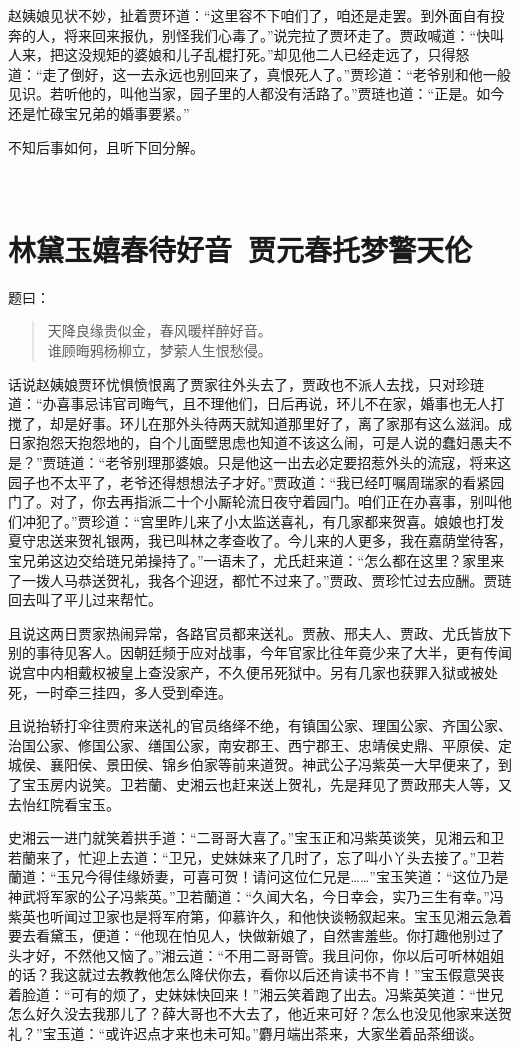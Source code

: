 \documentclass[12pt,oneside]{book}
\newenvironment{shici}{%
\begin{verse}%
\centering\large\hspace{12pt}}%
{\end{verse}}
\begin{document}
赵姨娘见状不妙，扯着贾环道：“这里容不下咱们了，咱还是走罢。到外面自有投奔的人，将来回来报仇，别怪我们心毒了。”说完拉了贾环走了。贾政喊道：“快叫人来，把这没规矩的婆娘和儿子乱棍打死。”却见他二人已经走远了，只得怒道：“走了倒好，这一去永远也别回来了，真恨死人了。”贾珍道：“老爷别和他一般见识。若听他的，叫他当家，园子里的人都没有活路了。”贾琏也道：“正是。如今还是忙碌宝兄弟的婚事要紧。”

不知后事如何，且听下回分解。

 
 
\chapter{林黛玉嬉春待好音~贾元春托梦警天伦}
题曰：

\begin{shici}
天降良缘贵似金，春风暖样醉好音。\\
谁顾晦鸦杨柳立，梦萦人生恨愁侵。
\end{shici}

话说赵姨娘贾环忧惧愤恨离了贾家往外头去了，贾政也不派人去找，只对珍琏道：“办喜事忌讳官司晦气，且不理他们，日后再说，环儿不在家，婚事也无人打搅了，却是好事。环儿在那外头待两天就知道那里好了，离了家那有这么滋润。成日家抱怨天抱怨地的，自个儿面壁思虑也知道不该这么闹，可是人说的蠢妇愚夫不是？”贾琏道：“老爷别理那婆娘。只是他这一出去必定要招惹外头的流寇，将来这园子也不太平了，老爷还得想想法子才好。”贾政道：“我已经叮嘱周瑞家的看紧园门了。对了，你去再指派二十个小厮轮流日夜守着园门。咱们正在办喜事，别叫他们冲犯了。”贾珍道：“宫里昨儿来了小太监送喜礼，有几家都来贺喜。娘娘也打发夏守忠送来贺礼银两，我已叫林之孝查收了。今儿来的人更多，我在嘉荫堂待客，宝兄弟这边交给琏兄弟操持了。”一语未了，尤氏赶来道：“怎么都在这里？家里来了一拨人马恭送贺礼，我各个迎迓，都忙不过来了。”贾政、贾珍忙过去应酬。贾琏回去叫了平儿过来帮忙。

且说这两日贾家热闹异常，各路官员都来送礼。贾赦、邢夫人、贾政、尤氏皆放下别的事待见客人。因朝廷频于应对战事，今年官家比往年竟少来了大半，更有传闻说宫中内相戴权被皇上查没家产，不久便吊死狱中。另有几家也获罪入狱或被处死，一时牵三挂四，多人受到牵连。

且说抬轿打伞往贾府来送礼的官员络绎不绝，有镇国公家、理国公家、齐国公家、治国公家、修国公家、缮国公家，南安郡王、西宁郡王、忠靖侯史鼎、平原侯、定城侯、襄阳侯、景田侯、锦乡伯家等前来道贺。神武公子冯紫英一大早便来了，到了宝玉房内说笑。卫若蘭、史湘云也赶来送上贺礼，先是拜见了贾政邢夫人等，又去怡红院看宝玉。

史湘云一进门就笑着拱手道：“二哥哥大喜了。”宝玉正和冯紫英谈笑，见湘云和卫若蘭来了，忙迎上去道：“卫兄，史妹妹来了几时了，忘了叫小丫头去接了。”卫若蘭道：“玉兄今得佳缘娇妻，可喜可贺！请问这位仁兄是……”宝玉笑道：“这位乃是神武将军家的公子冯紫英。”卫若蘭道：“久闻大名，今日幸会，实乃三生有幸。”冯紫英也听闻过卫家也是将军府第，仰慕许久，和他快谈畅叙起来。宝玉见湘云急着要去看黛玉，便道：“他现在怕见人，快做新娘了，自然害羞些。你打趣他别过了头才好，不然他又恼了。”湘云道：“不用二哥哥管。我且问你，你以后可听林姐姐的话？我这就过去教教他怎么降伏你去，看你以后还肯读书不肯！”宝玉假意哭丧着脸道：“可有的烦了，史妹妹快回来！”湘云笑着跑了出去。冯紫英笑道：“世兄怎么好久没去我那儿了？薛大哥也不大去了，他近来可好？怎么也没见他家来送贺礼？”宝玉道：“或许迟点才来也未可知。”麝月端出茶来，大家坐着品茶细谈。
\end{document}
